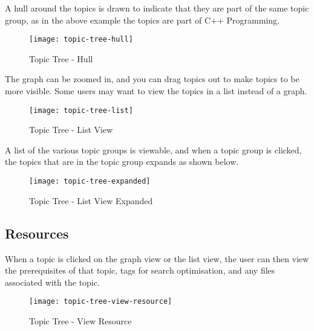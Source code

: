 A hull around the topics is drawn to indicate that they are part of the same topic group, as in the above example the topics are part of C++ Programming.\\

\begin{figure}[h!]
    \centering
    \texttt{[image: topic-tree-hull]}
    \caption{Topic Tree - Hull}
\end{figure}

The graph can be zoomed in, and you can drag topics out to make topics to be more visible. Some users may want to view the topics in a list instead of a graph.\\

\begin{figure}[h!]
    \centering
    \texttt{[image: topic-tree-list]}
    \caption{Topic Tree - List View}
\end{figure}

A list of the various topic groups is viewable, and when a topic group is clicked, the topics that are in the topic group expands as shown below.\\

\begin{figure}[h!]
    \centering
    \texttt{[image: topic-tree-expanded]}
    \caption{Topic Tree - List View Expanded}
\end{figure}

\subsection{Resources}

When a topic is clicked on the graph view or the list view, the user can then view the prerequisites of that topic, tags for search optimisation, and any files associated with the topic.

\begin{figure}[h!]
    \centering
    \texttt{[image: topic-tree-view-resource]}
    \caption{Topic Tree - View Resource}
\end{figure}

